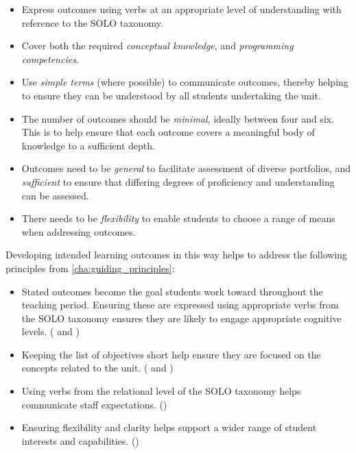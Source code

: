\begin{itemize}[noitemsep,nolistsep]
  \item Express outcomes using verbs at an appropriate level of understanding with reference to the SOLO taxonomy.
  \item Cover both the required \emph{conceptual knowledge}, and \emph{programming competencies}.
  \item Use \emph{simple terms} (where possible) to communicate outcomes, thereby helping to ensure they can be understood by all students undertaking the unit.
  \item The number of outcomes should be \emph{minimal}, ideally between four and six. This is to help ensure that each outcome covers a meaningful body of knowledge to a sufficient depth.
  \item Outcomes need to be \emph{general} to facilitate assessment of diverse portfolios, and \emph{sufficient} to ensure that differing degrees of proficiency and understanding can be assessed.
  \item There needs to be \emph{flexibility} to enable students to choose a range of means when addressing outcomes.
\end{itemize}

Developing intended learning outcomes in this way helps to address the following principles from \cref{cha:guiding_principles}:
\begin{itemize}[noitemsep,nolistsep]
	\item Stated outcomes become the goal students work toward throughout the teaching period. Ensuring these are expressed using appropriate verbs from the SOLO taxonomy ensures they are likely to engage appropriate cognitive levels. ( and )
	\item Keeping the list of objectives short help ensure they are focused on the concepts related to the unit. ( and )
	\item Using verbs from the relational level of the SOLO taxonomy helps communicate staff expectations. ()
	\item Ensuring flexibility and clarity helps support a wider range of student interests and capabilities. ()
\end{itemize}





